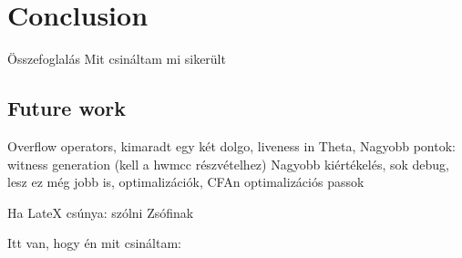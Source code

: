 \section{Conclusion}
Összefoglalás
Mit csináltam
mi sikerült

\subsection{Future work}
Overflow operators, kimaradt egy két dolgo, liveness in Theta, Nagyobb pontok: witness generation (kell a hwmcc részvételhez)
Nagyobb kiértékelés, sok debug, lesz ez még jobb is, optimalizációk, CFAn optimalizációs passok

Ha LateX csúnya: szólni Zsófinak

Itt van, hogy én mit csináltam: 
